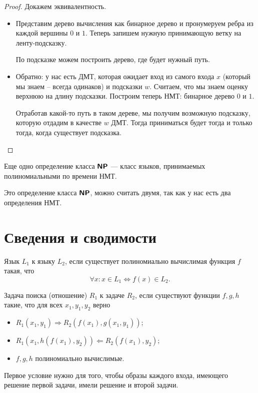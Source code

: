 \begin{proof}
	Докажем эквивалентность. 
	\begin{itemize}                                              \item Представим дерево вычисления как бинарное дерево и пронумеруем ребра из каждой вершины $ 0$ и $ 1$. Теперь запишем нужную     принимающую ветку на ленту-подсказку.
	
        По подсказке можем построить дерево, где будет нужный путь.
    \item Обратно: у нас есть ДМТ, которая ожидает вход из самого входа $x$ (который мы знаем -- всегда одинаков) и подсказки $w$.    
        Считаем, что мы знаем оценку верхнюю на длину подсказки. Построим теперь НМТ: бинарное дерево $0$ и $1$.

        Отработав какой-то путь в таком дереве, мы получим возможную подсказку, которую отдадим в качестве $w$ ДМТ. Тогда приниматься будет тогда и только тогда, когда существует подсказка.
    \end{itemize}

\end{proof}
\begin{defn}\index{\NP}
    Еще одно определение класса $ \textmd{\textbf{\textsf{NP}}}$ --- класс языков, принимаемых полиномиальными по времени НМТ.
\end{defn}
\begin{note}
    Это определение класса $\textmd{\textbf{\textsf{NP}}}$, можно считать двумя, так как у нас есть два определения НМТ.
\end{note}

\section{Сведения и сводимости}
\begin{defn}
	Язык $ L_1$   к языку $ L_2$, если существует полиномиально вычислимая функция $ f$ такая, что
	\[
		\forall x\colon x \in L_1 \Longleftrightarrow f(x) \in L_2
	.\] 
\end{defn}

\begin{defn}
	Задача поиска (отношение) $ R_1$  к задаче $ R_2$, если существуют функции $ f, g, h$ такие, что для всех  $ x_1, y_1, y_2$ верно
	\begin{itemize}
		\item $ R_1(x_1, y_1) \Longrightarrow R_2(f(x_1), g(x_1, y_1))$;
		\item $ R_1(x_1, h(f(x_1), y_2)) \Longleftarrow R_2(f(x_1), y_2)$;
		\item $ f, g, h$ полиномиально вычислимые.
	\end{itemize}
	\begin{note}
	    Первое условие нужно для того, чтобы образы каждого входа, имеющего решение первой задачи, имели решение и второй задачи.
	\end{note}
\end{defn}

